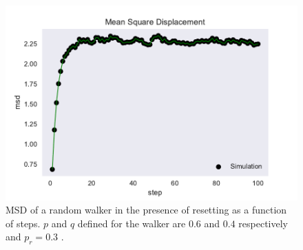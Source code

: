 \documentclass[showpacs,amsmath,amssymb,aps,pre,twocolumn]{revtex4-1}
\begin{document}
\begin{figure}[t]
    \centering
    \includegraphics[scale = 0.5]{msd_new.pdf}
    \caption{MSD of a random walker in the presence of resetting as a function of steps. $p$ and $q$ defined for the walker are $0.6$ and $0.4$ respectively and $p_r = 0.3$ .}
    \label{fig:my_label}
\end{figure}


















\end{document}
